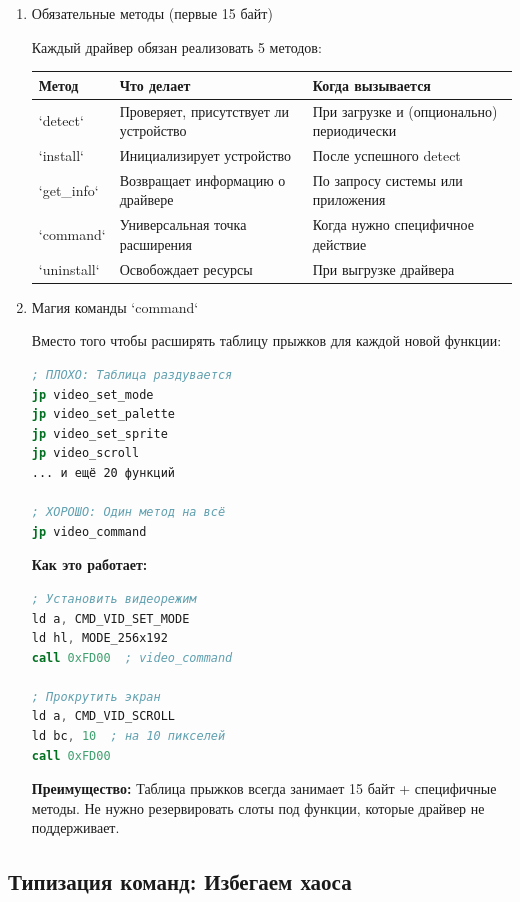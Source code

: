 \documentclass[11pt,a4paper]{scrartcl}
\begin{document}
\begin{enumerate}
\item Обязательные методы (первые 15 байт)
\label{sec:orgf4070ef}

Каждый драйвер обязан реализовать 5 методов:

\begin{center}
\begin{tabularx}{\textwidth}{|X|X|X|}
Метод & Что делает & Когда вызывается\\
\hline
`detect` & Проверяет, присутствует ли устройство & При загрузке и (опционально) периодически\\
`install` & Инициализирует устройство & После успешного detect\\
`get\_info` & Возвращает информацию о драйвере & По запросу системы или приложения\\
`command` & Универсальная точка расширения & Когда нужно специфичное действие\\
`uninstall` & Освобождает ресурсы & При выгрузке драйвера\\
\end{tabularx}
\end{center}
\item Магия команды `command`
\label{sec:org5ce7cb6}

Вместо того чтобы расширять таблицу прыжков для каждой новой функции:

\begin{lstlisting}[language=asm,numbers=none]
; ПЛОХО: Таблица раздувается
jp video_set_mode
jp video_set_palette  
jp video_set_sprite
jp video_scroll
... и ещё 20 функций

; ХОРОШО: Один метод на всё
jp video_command
\end{lstlisting}

\textbf{Как это работает:}

\begin{lstlisting}[language=asm,numbers=none]
; Установить видеорежим
ld a, CMD_VID_SET_MODE
ld hl, MODE_256x192
call 0xFD00  ; video_command

; Прокрутить экран
ld a, CMD_VID_SCROLL  
ld bc, 10  ; на 10 пикселей
call 0xFD00
\end{lstlisting}

\textbf{Преимущество:} Таблица прыжков всегда занимает 15 байт + специфичные методы. Не нужно резервировать слоты под функции, которые драйвер не поддерживает.
\end{enumerate}
\subsection{Типизация команд: Избегаем хаоса}
\label{sec:orgadad53b}
\end{document}
